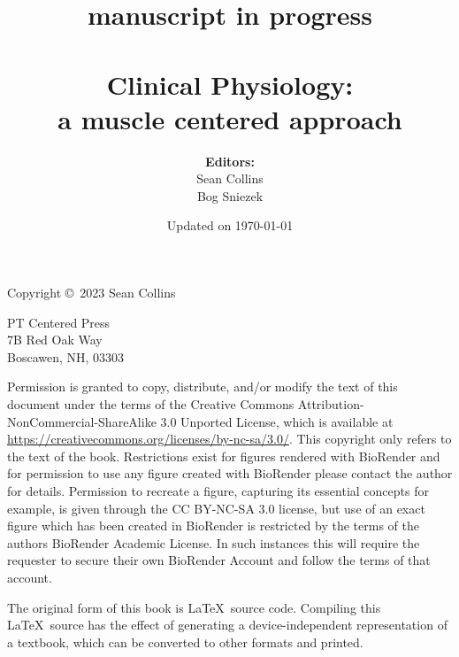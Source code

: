 
% 




\title{manuscript in progress \\~\\ {\bf{\huge{Clinical Physiology:}}  \\ a muscle centered approach}}

\author{\textbf{Editors:} \\ Sean Collins \\ Bog Sniezek \\}

\date{Updated on \today}
\maketitle

\pagebreak
\thispagestyle{empty}

{\small
Copyright \copyright ~2023 Sean Collins


\vspace{0.2in}

\begin{flushleft}
PT Centered Press       \\
7B Red Oak Way        \\
Boscawen, NH, 03303
\end{flushleft}

Permission is granted to copy, distribute, and/or modify the text of this document under the terms of the Creative Commons Attribution-NonCommercial-ShareAlike 3.0 Unported License, which is available at \url{https://creativecommons.org/licenses/by-nc-sa/3.0/}. This copyright only refers to the text of the book. Restrictions exist for figures rendered with BioRender and for permission to use any figure created with BioRender please contact the author for details. Permission to recreate a figure, capturing its essential concepts for example, is given through the CC BY-NC-SA 3.0 license, but use of an exact figure which has been created in BioRender is restricted by the terms of the authors BioRender Academic License. In such instances this will require the requester to secure their own BioRender Account and follow the terms of that account.

The original form of this book is \LaTeX\ source code.  Compiling this \LaTeX\ source has the effect of generating a device-independent representation of a textbook, which can be converted to other formats and printed.

\vspace{0.2in}

} %

